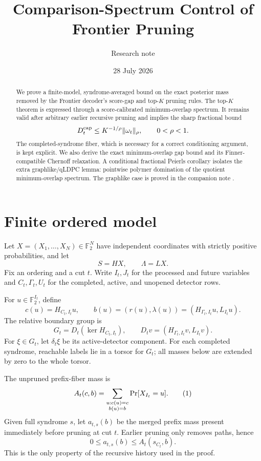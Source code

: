 \documentclass[11pt]{article}
\title{Comparison-Spectrum Control of Frontier Pruning}
\author{Research note}
\date{28 July 2026}
\newcommand{\F}{\mathbb F}
\newcommand{\Prb}{\mathop{\rm Pr}}
\newcommand{\1}{\mathbf 1}
\begin{document}
\maketitle

\begin{abstract}
We prove a finite-model, syndrome-averaged bound on the exact posterior mass
removed by the Frontier decoder's score-gap and top-\(K\) pruning rules.  The
top-\(K\) theorem is expressed through a score-calibrated minimum-overlap
spectrum.  It remains valid after arbitrary earlier recursive pruning and
implies the sharp fractional bound
\[
  D_t^{\rm cap}\le K^{-1/\rho}\|\omega_t\|_\rho,\qquad 0<\rho<1.
\]
The completed-syndrome fiber, which is necessary for a correct conditioning
argument, is kept explicit.  We also derive the exact minimum-overlap gap
bound and its Finner-compatible Chernoff relaxation.  A conditional fractional
Peierls corollary isolates the extra graphlike/qLDPC lemma: pointwise polymer
domination of the quotient minimum-overlap spectrum.  The graphlike case is
proved in the companion note
\texttt{}.
\end{abstract}

\section{Finite ordered model}

Let \(X=(X_1,\ldots,X_N)\in\F_2^N\) have independent coordinates with
strictly positive probabilities, and let
\[
  S=HX,\qquad \Lambda=LX.
\]
Fix an ordering and a cut \(t\).  Write \(I_t,J_t\) for the processed and
future variables and \(C_t,\Gamma_t,U_t\) for the completed, active, and
unopened detector rows.

For \(u\in\F_2^{I_t}\), define
\[
  c(u)=H_{C_t,I_t}u,\qquad
  b(u)=(r(u),\lambda(u))
      =(H_{\Gamma_t,I_t}u,L_{I_t}u).
\]
The relative boundary group is
\[
  G_t=D_t(\ker H_{C_t,I_t}),\qquad
  D_tv=(H_{\Gamma_t,I_t}v,L_{I_t}v).
\]
For \(\xi\in G_t\), let \(\delta_t\xi\) be its active-detector component.
For each completed syndrome, reachable labels lie in a torsor for \(G_t\);
all masses below are extended by zero to the whole torsor.

The unpruned prefix-fiber mass is
\[
  A_t(c,b)=
  \sum_{\substack{u:c(u)=c\\b(u)=b}}\Prb[X_{I_t}=u].
  \tag{1}
\]
Given full syndrome \(s\), let \(a_{t,s}(b)\) be the merged prefix mass
present immediately before pruning at cut \(t\).  Earlier pruning only removes
paths, hence
\[
  0\le a_{t,s}(b)\le A_t(s_{C_t},b).
  \tag{2}
\]
This is the only property of the recursive history used in the proof.
\end{document}
